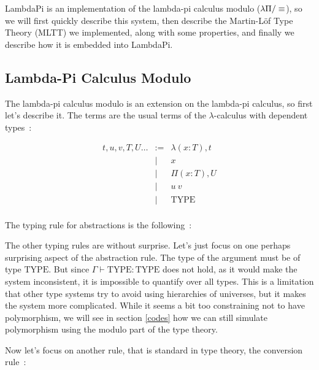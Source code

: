 
LambdaPi is an implementation of the lambda-pi calculus modulo ($\lp$), so we
will first quickly describe this system, then describe the Martin-Löf Type
Theory (MLTT) we implemented, along with some properties, and finally we
describe how it is embedded into LambdaPi.

\subsection{Lambda-Pi Calculus Modulo}

The lambda-pi calculus modulo is an extension on the lambda-pi calculus, so
first let's describe it. The terms are the usual terms of the $\lambda$-calculus with
dependent types~:

\[\begin{array}{rcl}
    t, u, v, T, U\dots & := & \lambda(x : T), t \\
    & | & x \\
    & | & \Pi(x : T), U \\
    & | & u\ v \\
    & | & \text{TYPE} \\
 \end{array}\]

The typing rule for abstractions is the following~:

\begin{center}\begin{prooftree}
\end{prooftree}\end{center}

The other typing rules are without surprise. Let's just focus on one perhaps
surprising aspect of the abstraction rule. The type of the argument must be of
type $\text{TYPE}$. But since $\Gamma\vdash\text{TYPE} : \text{TYPE}$ does not hold, as it
would make the system inconsistent, it is impossible to quantify over all types.
This is a limitation that other type systems try to avoid using hierarchies of
universes, but it makes the system more complicated. While it seems a bit too
constraining not to have polymorphism, we will see in section \ref{codes} how we
can still simulate polymorphism using the modulo part of the type theory.

Now let's focus on another rule, that is standard in type theory, the conversion
rule~:

\begin{center}\begin{prooftree}
\end{prooftree}\end{center}

